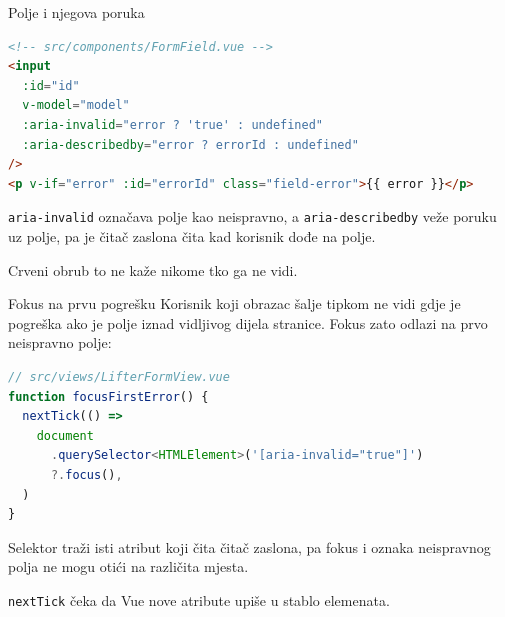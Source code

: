 \begin{frame}[fragile]{Polje i njegova poruka}
\begin{lstlisting}[language=html]
<!-- src/components/FormField.vue -->
<input
  :id="id"
  v-model="model"
  :aria-invalid="error ? 'true' : undefined"
  :aria-describedby="error ? errorId : undefined"
/>
<p v-if="error" :id="errorId" class="field-error">{{ error }}</p>
\end{lstlisting}

\vspace{0.4em}
\texttt{aria-invalid} označava polje kao neispravno, a \texttt{aria-describedby} veže poruku uz polje, pa je čitač zaslona čita kad korisnik dođe na polje.

\vspace{0.4em}
Crveni obrub to ne kaže nikome tko ga ne vidi.
\end{frame}

\begin{frame}[fragile]{Fokus na prvu pogrešku}
Korisnik koji obrazac šalje tipkom  ne vidi gdje je pogreška ako je polje iznad vidljivog dijela stranice. Fokus zato odlazi na prvo neispravno polje:

\begin{lstlisting}[language=typescript]
// src/views/LifterFormView.vue
function focusFirstError() {
  nextTick(() =>
    document
      .querySelector<HTMLElement>('[aria-invalid="true"]')
      ?.focus(),
  )
}
\end{lstlisting}

\vspace{0.3em}
Selektor traži isti atribut koji čita čitač zaslona, pa fokus i oznaka neispravnog polja ne mogu otići na različita mjesta.

\vspace{0.3em}
\texttt{nextTick} čeka da Vue nove atribute upiše u stablo elemenata.
\end{frame}


